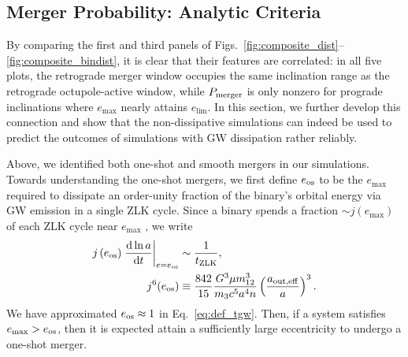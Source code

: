 \documentclass[
        fleqn,
        usenatbib,
    ]{mnras}
\newcommand*{\rd}[2]{\frac{\mathrm{d}#1}{\mathrm{d}#2}}
\newcommand*{\at}[1]{\left.#1\right|}
\newcommand*{\p}[1]{\left(#1\right)}
\begin{document}
\subsection{Merger Probability: Analytic Criteria}\label{ss:nogw_merger}

By comparing the first and third panels of
Figs.~\ref{fig:composite_dist}--\ref{fig:composite_bindist}, it is clear that
their features are correlated: in all five plots, the retrograde merger window
occupies the same inclination range as the retrograde octupole-active window,
while $P_{\rm merger}$ is only nonzero for prograde inclinations where
$e_{\max}$ nearly attains $e_{\lim}$. In this section, we further develop this
connection and show that the non-dissipative simulations can indeed be used to
predict the outcomes of simulations with GW dissipation rather reliably.

Above, we identified both one-shot and smooth mergers in our simulations.
Towards understanding the one-shot mergers, we first define $e_{\rm os}$ to be
the $e_{\max}$ required to dissipate an order-unity fraction of the binary's
orbital energy via GW emission in a single ZLK cycle. Since a binary spends a
fraction $\sim j(e_{\max})$ of each ZLK cycle near $e_{\max}$
\citep[e.g.][]{anderson2016formation}, we write
\begin{align}
    j\p{e_{\rm os}}\at{\rd{\ln a}{t}}_{e = e_{\rm os}} &\sim
        \frac{1}{t_{\rm ZLK}},\\
    j^6(e_{\rm os})
        &\equiv \frac{842}{15}
            \frac{G^3 \mu m_{12}^3}{m_3c^5a^4n}
            \p{\frac{a_{\rm out, eff}}{a}}^3.
            \label{eq:def_e_os}
\end{align}
We have approximated $e_{\rm os} \approx 1$ in Eq.~\eqref{eq:def_tgw}. Then, if
a system satisfies $e_{\max} > e_{\rm os}$, then it is expected attain a
sufficiently large eccentricity to undergo a one-shot merger.
\end{document}
